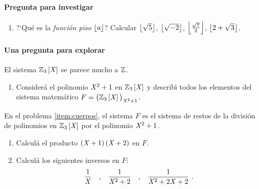 \paragraph{Pregunta para investigar}

\begin{enumerate}[label=P\arabic*]
	\item\label{item:piso}
		?`Qu\'e es la \emph{funci\'on piso} $\piso a$?
		Calcular $\piso{\sqrt 5}$, $\piso{\sqrt{-2}}$,
		$\piso{\frac{\sqrt 7} 2}$, $\piso{2+\sqrt 3}$.
	\seti
\end{enumerate}
%

\paragraph{Una pregunta para explorar}
El sistema $\polinomios{\Enterosmod[3]}$ se parece mucho a $\Enteros$.
\begin{enumerate}[label=P\arabic*]
	\conti
	\item\label{item:cuerpos}
		Consider\'a el polinomio $\indet^2+1$ en
		$\polinomios{\Enterosmod[3]}$ y describ\'{\i} todos
		los elementos del sistema matem\'atico
		$F=\big(\polinomios{\Enterosmod[3]}\big)_{\indet^2+1}$.
	\seti
\end{enumerate}
%
En el problema \ref{item:cuerpos}, el sistema $F$ es el sistema de
restos de la divisi\'on de polinomios en $\polinomios{\Enterosmod[3]}$
por el polinomio $\indet^2+1$.
\begin{enumerate}[label=P\arabic*]
	\conti
	\item\label{item:cuerpos:producto}
		Calcul\'a el producto $(\indet+1)\,(\indet+2)$ en $F$.
	\item\label{item:cuerpos:inversos}
		Calcul\'a los siguientes inversos en $F$:
		\begin{displaymath}
			\frac 1 \indet\quad\text{,}\quad
			\frac 1{\indet^2+2}\quad\text{,}\quad
			\frac 1{\indet^2+2\indet+2}\text{ .}
		\end{displaymath}
	\seti
\end{enumerate}
%


